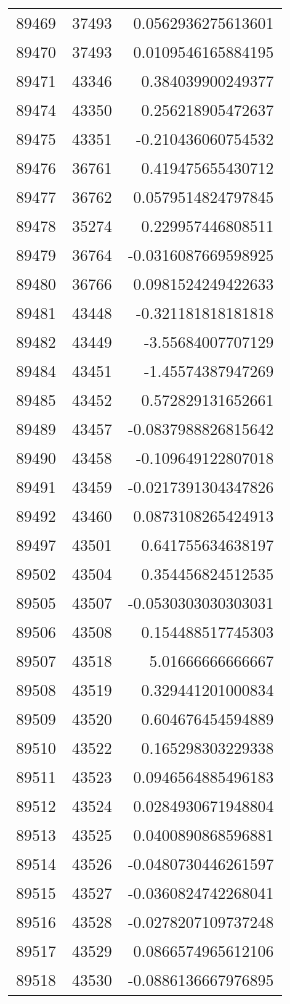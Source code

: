 \begin{tabular}{r | r | r}
89469 & 37493 & 0.0562936275613601 \\
89470 & 37493 & 0.0109546165884195 \\
89471 & 43346 & 0.384039900249377 \\
89474 & 43350 & 0.256218905472637 \\
89475 & 43351 & -0.210436060754532 \\
89476 & 36761 & 0.419475655430712 \\
89477 & 36762 & 0.0579514824797845 \\
89478 & 35274 & 0.229957446808511 \\
89479 & 36764 & -0.0316087669598925 \\
89480 & 36766 & 0.0981524249422633 \\
89481 & 43448 & -0.321181818181818 \\
89482 & 43449 & -3.55684007707129 \\
89484 & 43451 & -1.45574387947269 \\
89485 & 43452 & 0.572829131652661 \\
89489 & 43457 & -0.0837988826815642 \\
89490 & 43458 & -0.109649122807018 \\
89491 & 43459 & -0.0217391304347826 \\
89492 & 43460 & 0.0873108265424913 \\
89497 & 43501 & 0.641755634638197 \\
89502 & 43504 & 0.354456824512535 \\
89505 & 43507 & -0.0530303030303031 \\
89506 & 43508 & 0.154488517745303 \\
89507 & 43518 & 5.01666666666667 \\
89508 & 43519 & 0.329441201000834 \\
89509 & 43520 & 0.604676454594889 \\
89510 & 43522 & 0.165298303229338 \\
89511 & 43523 & 0.0946564885496183 \\
89512 & 43524 & 0.0284930671948804 \\
89513 & 43525 & 0.0400890868596881 \\
89514 & 43526 & -0.0480730446261597 \\
89515 & 43527 & -0.0360824742268041 \\
89516 & 43528 & -0.0278207109737248 \\
89517 & 43529 & 0.0866574965612106 \\
89518 & 43530 & -0.0886136667976895 \\

\end{tabular}
